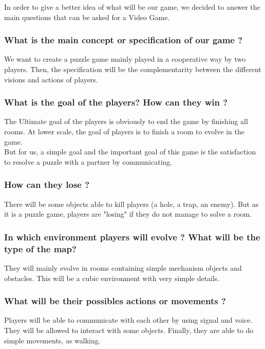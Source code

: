 \documentclass[12pt]{article}
\begin{document}
        In order to give a better idea of what will be our game, we decided to answer the main questions that can be asked for a Video Game.

		\subsubsection*{What is the main concept or specification of our game ?}
			We want to create a puzzle game mainly played in a cooperative way by two players. Then, the specification will be the complementarity between the different visions and actions of players.

		\subsubsection*{What is the goal of the players? How can they win ?}
			The Ultimate goal of the players is obviously to end the game by finishing all rooms. At lower scale, the goal of players is to finish a room to evolve in the game.\\
			But for us, a simple goal and the important goal of this game is the satisfaction to resolve a puzzle with a partner by communicating.
            
        \subsubsection*{How can they lose ?}
			There will be some objects able to kill players (a hole, a trap, an enemy). But as it is a puzzle game, players are "losing" if they do not manage to solve a room.

		\subsubsection*{In which environment players will evolve ? What will be the type of the map?}
			They will mainly evolve in rooms containing simple mechanism objects and obstacles. This will be a cubic environment with very simple details.

		\subsubsection*{What will be their possibles actions or movements ?}
			Players will be able to communicate with each other by using signal and voice. They will be allowed to interact with some objects. Finally, they are able to do simple movements, as walking.
\end{document}
